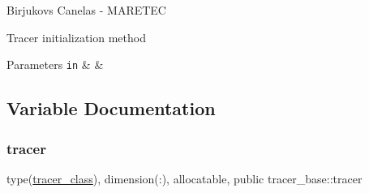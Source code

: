 Birjukovs Canelas -\/ M\+A\+R\+E\+T\+EC 

Tracer initialization method 
\begin{DoxyParams}[1]{Parameters}
\mbox{\tt in}  & {\em } & \\
\hline
\end{DoxyParams}


\subsection{Variable Documentation}
\mbox{\label{namespacetracer__base_a7f839546575f08e3b944dafdf5e0b2d2}} 
\subsubsection{\texorpdfstring{tracer}{tracer}}
{\footnotesize\ttfamily type(\hyperlink{structtracer__base_1_1tracer__class}{tracer\+\_\+class}), dimension(\+:), allocatable, public tracer\+\_\+base\+::tracer}

